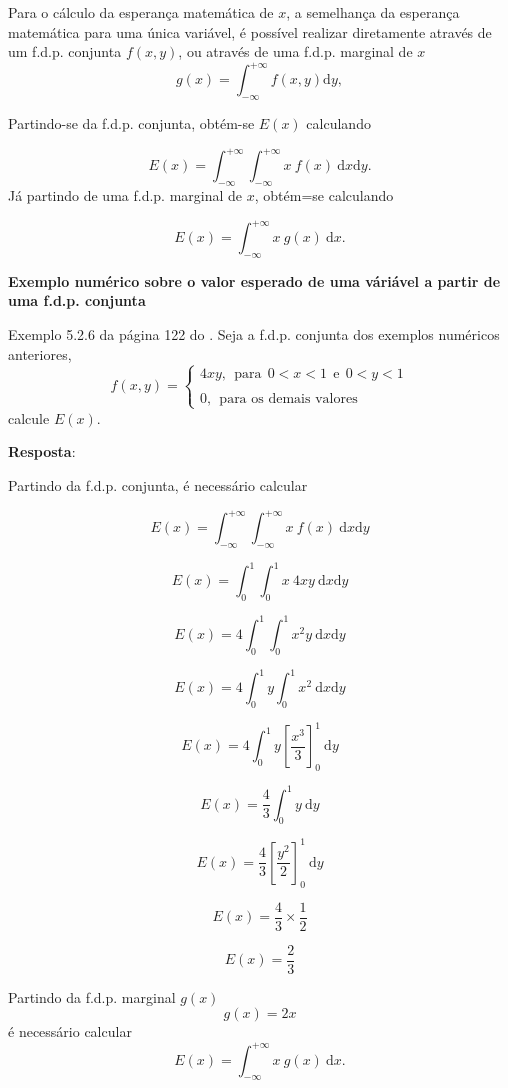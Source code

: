 \documentclass[
]{book}
\begin{document}
Para o cálculo da esperança matemática de \(x\), a semelhança da esperança matemática para uma única variável, é possível realizar diretamente através de um f.d.p. conjunta \(f(x,y)\), ou através de uma f.d.p. marginal de \(x\)
\[
  g(x) = \int_{-\infty}^{+\infty} f(x,y) \text{d}y,
\]

Partindo-se da f.d.p. conjunta, obtém-se \(E(x)\) calculando

\[
  E(x) = \int_{-\infty}^{+\infty} \int_{-\infty}^{+\infty} x~f(x)~\text{d}x\text{d}y.
\]
Já partindo de uma f.d.p. marginal de \(x\), obtém=se calculando

\[
  E(x) = \int_{-\infty}^{+\infty} x~g(x)~\text{d}x.
\]

\textbf{Exemplo numérico sobre o valor esperado de uma váriável a partir de uma f.d.p. conjunta}

Exemplo 5.2.6 da página 122 do \citet{Sartoris2013}. Seja a f.d.p. conjunta dos exemplos numéricos anteriores,
\begin{equation}
  f(x,y) = 
    \begin{cases}
      4xy,~~\text{para}~~0 < x < 1~~\text{e}~~0 < y < 1 \\
      \\
      0, ~~\text{para os demais valores}
    \end{cases}
\end{equation}
calcule \(E(x)\).

\textbf{Resposta}:

Partindo da f.d.p. conjunta, é necessário calcular

\[
  E(x) = \int_{-\infty}^{+\infty} \int_{-\infty}^{+\infty} x~f(x)~\text{d}x\text{d}y
\]

\[
  E(x) = \int_{0}^{1} \int_{0}^{1} x~4xy~\text{d}x\text{d}y
\]

\[
  E(x) = 4\int_{0}^{1} \int_{0}^{1} x^2y~\text{d}x\text{d}y
\]

\[
  E(x) = 4\int_{0}^{1}y \int_{0}^{1} x^2~\text{d}x\text{d}y
\]

\[
  E(x) = 4\int_{0}^{1}y \left[ \dfrac{x^3}{3} \right]_{0}^{1}~\text{d}y
\]

\[
  E(x) = \dfrac{4}{3}\int_{0}^{1}y~\text{d}y
\]

\[
  E(x) = \dfrac{4}{3}\left[ \dfrac{y^2}{2} \right]_{0}^{1}~\text{d}y
\]

\[
  E(x) = \dfrac{4}{3}\times \dfrac{1}{2}
\]

\[
  E(x) = \dfrac{2}{3}
\]

Partindo da f.d.p. marginal \(g(x)\)
\[
  g(x) = 2x
\]
é necessário calcular
\[
  E(x) = \int_{-\infty}^{+\infty} x~g(x)~\text{d}x.
\]
\end{document}
